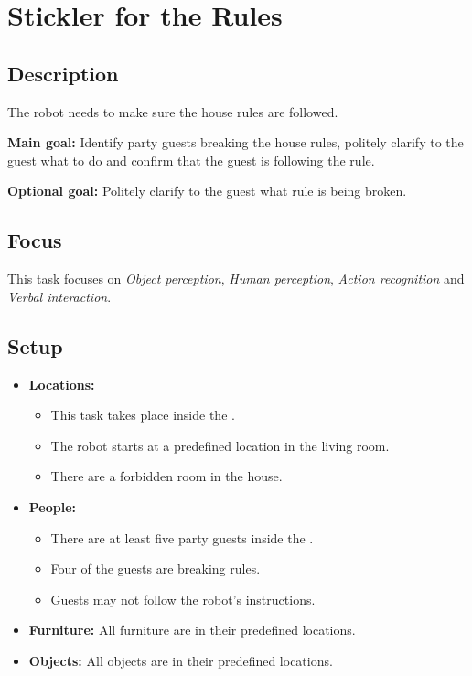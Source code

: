 \section{Stickler for the Rules}
\label{test:stickler-for-the-rules}

\subsection*{Description}
The robot needs to make sure the house rules are followed.

\textbf{Main goal:}
Identify party guests breaking the house rules, politely clarify to the guest what to do and confirm that the guest is following the rule.

\textbf{Optional goal:}
Politely clarify to the guest what rule is being broken.


\subsection*{Focus}
This task focuses on
\textit{Object perception},
\textit{Human perception},
\textit{Action recognition} and
\textit{Verbal interaction}.

\subsection*{Setup}
\begin{itemize}[nosep]	
	\item \textbf{Locations:} 
	\begin{itemize}
		\item This task takes place inside the \Arena{}.
		\item The robot starts at a predefined location in the living room.
		\item There are a forbidden room in the house.
	\end{itemize}	 
	\item \textbf{People:} 
	\begin{itemize}
		\item There are at least five party guests inside the \Arena{}.
		\item Four of the guests are breaking rules.
		\item Guests may not follow the robot's instructions.
	\end{itemize}
	\item \textbf{Furniture:} All furniture are in their predefined locations.
	\item \textbf{Objects:} All objects are in their predefined locations.
\end{itemize}

